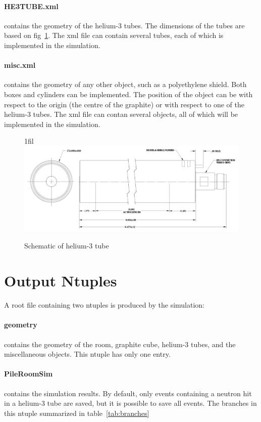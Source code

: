 \documentclass{article}
\makeatletter
\newcommand*{\centerfloat}{%
  \parindent \z@
  \leftskip \z@ \@plus 1fil \@minus \textwidth
  \rightskip\leftskip
  \parfillskip \z@skip}
\makeatother
\begin{document}
	\paragraph{HE3TUBE.xml} contains the geometry of the helium-3 tubes. The dimensions of the tubes are based on fig~\ref{fig:tubeSchematic}. The xml file can contain several tubes, each of which is implemented in the simulation.



	\paragraph{misc.xml} contains the geometry of any other object, such as a polyethylene shield. Both boxes and cylinders can be implemented. The position of the object can be with respect to the origin (the centre of the graphite) or with respect to one of the helium-3 tubes. The xml file can contan several objects, all of which will be implemented in the simulation.


\begin{figure}
	\centerfloat
	\includegraphics[width=\columnwidth]{images/GESchematic.pdf}
	\caption{Schematic of helium-3 tube}	
	\label{fig:tubeSchematic}
\end{figure}


\section{Output Ntuples}

	A root file containing two ntuples is produced by the simulation:

	\paragraph{geometry} contains the geometry of the room, graphite cube, helium-3 tubes, and the miscellaneous objects. This ntuple has only one entry.

	\paragraph{PileRoomSim} contains the simulation results. By default, only events containing a neutron hit in a helium-3 tube are saved, but it is possible to save all events. The branches in this ntuple summarized in table~\ref{tab:branches}
\end{document}
